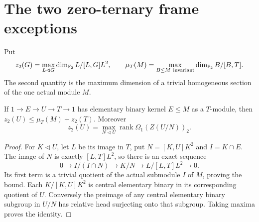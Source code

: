 \section{The two zero-ternary frame exceptions}
\label{sec:zero-ternary-frames}
Put
\[
 z_2(G)=\max_{L\lhd G}\dim_{\F_2}L/[L,G]L^2,
 \qquad
 \mu_T(M)=\max_{B\leq M\ {\mathrm{invariant}}}\dim_{\F_2}B/[B,T].
\]
The second quantity is the maximum dimension of a trivial homogeneous
section of the one actual module $M$.

\begin{lemma}\label{lem:frame-rank}
If $1\to E\to U\to T\to1$ has elementary binary kernel
$E\leq M$ as a $T$-module, then
$z_2(U)\leq\mu_T(M)+z_2(T)$. Moreover
\[
 z_2(U)=\max_{N\lhd U}\operatorname{rank}\Omega_1(Z(U/N))_2.
\]
\end{lemma}
\begin{proof}
For $K\lhd U$, let $L$ be its image in $T$, put
$N=[K,U]K^2$ and $I=K\cap E$. The image of $N$ is exactly
$[L,T]L^2$, so there is an exact sequence
\[
 0\longrightarrow I/(I\cap N)\longrightarrow K/N
       \longrightarrow L/[L,T]L^2\longrightarrow0.
\]
Its first term is a trivial quotient of the actual submodule $I$
of $M$, proving the bound. Each $K/[K,U]K^2$ is central elementary
binary in its corresponding quotient of $U$. Conversely the preimage
of any central elementary binary subgroup in $U/N$ has relative
head surjecting onto that subgroup. Taking maxima proves the identity.
\end{proof}

